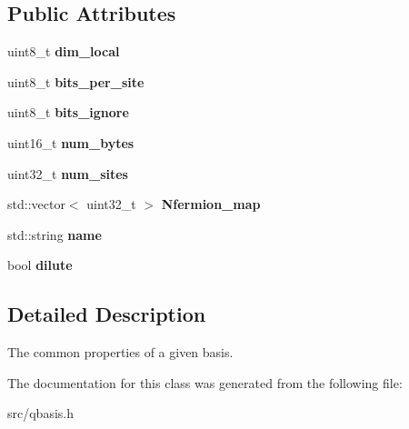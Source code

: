 \subsection*{Public Attributes}
\begin{DoxyCompactItemize}
\item 
\mbox{\label{classqbasis_1_1basis__prop_aa326a913e46796504cecfa9b76a302ea}} 
uint8\+\_\+t {\bfseries dim\+\_\+local}
\item 
\mbox{\label{classqbasis_1_1basis__prop_a850852c3a317519a5d8be2726bffa870}} 
uint8\+\_\+t {\bfseries bits\+\_\+per\+\_\+site}
\item 
\mbox{\label{classqbasis_1_1basis__prop_ae53bd655dba2bbf8a54c8875541d907d}} 
uint8\+\_\+t {\bfseries bits\+\_\+ignore}
\item 
\mbox{\label{classqbasis_1_1basis__prop_aca700fa5c9aae66e42aaa9eb2b7b9349}} 
uint16\+\_\+t {\bfseries num\+\_\+bytes}
\item 
\mbox{\label{classqbasis_1_1basis__prop_afe5546c3a4eeda8115609cf4544c22b6}} 
uint32\+\_\+t {\bfseries num\+\_\+sites}
\item 
\mbox{\label{classqbasis_1_1basis__prop_a43d8778f7812b0f71b0a338484b8e7e6}} 
std\+::vector$<$ uint32\+\_\+t $>$ {\bfseries Nfermion\+\_\+map}
\item 
\mbox{\label{classqbasis_1_1basis__prop_a5eb48dd5220c30bd01f70d8b7e37b895}} 
std\+::string {\bfseries name}
\item 
\mbox{\label{classqbasis_1_1basis__prop_af1f63a0d5fcdf70086160d9ec4d0d9b4}} 
bool {\bfseries dilute}
\end{DoxyCompactItemize}


\subsection{Detailed Description}
The common properties of a given basis. 



The documentation for this class was generated from the following file\+:\begin{DoxyCompactItemize}
\item 
src/qbasis.\+h\end{DoxyCompactItemize}

